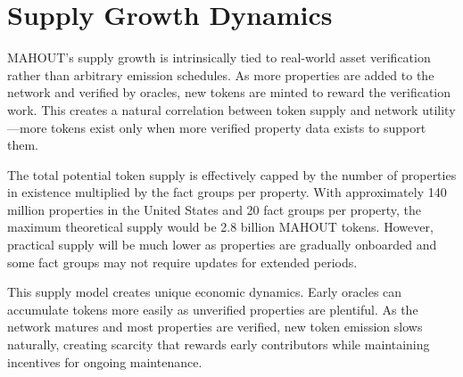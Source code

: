 \section{Supply Growth Dynamics}

MAHOUT's supply growth is intrinsically tied to real-world asset verification rather than arbitrary emission schedules. As more properties are added to the network and verified by oracles, new tokens are minted to reward the verification work. This creates a natural correlation between token supply and network utility—more tokens exist only when more verified property data exists to support them.

The total potential token supply is effectively capped by the number of properties in existence multiplied by the fact groups per property. With approximately 140 million properties in the United States and 20 fact groups per property, the maximum theoretical supply would be 2.8 billion MAHOUT tokens. However, practical supply will be much lower as properties are gradually onboarded and some fact groups may not require updates for extended periods.

This supply model creates unique economic dynamics. Early oracles can accumulate tokens more easily as unverified properties are plentiful. As the network matures and most properties are verified, new token emission slows naturally, creating scarcity that rewards early contributors while maintaining incentives for ongoing maintenance.

